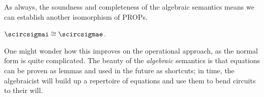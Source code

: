 As always, the soundness and completeness of the algebraic semantics means we
can establish another isomorphism of PROPs.

\begin{corollary}
    \(\scircsigmai \cong \scircsigmae\).
\end{corollary}

One might wonder how this improves on the operational approach, as the
normal form is quite complicated.
The beauty of the \emph{algebraic} semantics is that equations can be proven
as lemmas and used in the future as shortcuts; in time, the algebraicist will
build up a repertoire of equations and use them to bend circuits to
their will.